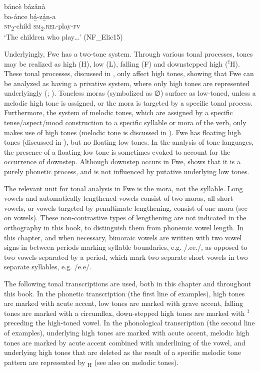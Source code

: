 \ea
\label{bkm:Ref98929728}
báncè bázânà\\
\gll ba-ánce  bá̲-zá̲n-a\\
\textsc{np}\textsubscript{2}-child  \textsc{sm}\textsubscript{2}.\textsc{rel}-play-\textsc{fv}\\
\glt ‘The children who play…’ (NF\_Elic15)
\z

Underlyingly, Fwe has a two-tone system. Through various tonal processes, tones may be realized as high (H), low (L), falling (F) and downstepped high (ꜝH). These tonal pro\-cesses, discussed in , only affect high tones, showing that Fwe can be analyzed as hav\-ing a privative system, where only high tones are represented underlyingly (\citealt{Hyman2001}; \citealt{OddenMarlo2019}). Toneless moras (symbolized as ∅) surface as low-toned, unless a melodic high tone is assigned, or the mora is targeted by a specific tonal process. Furthermore, the system of melodic tones, which are assigned by a specific tense/aspect/mood construction to a specific syllable or mora of the verb, only makes use of high tones (melodic tone is discussed in ). Fwe has floating high tones (discussed in ), but no floating low tones. In the analysis of tone languages, the presence of a floating low tone is sometimes evoked to account for the occurrence of downstep. Although downstep occurs in Fwe,  shows that it is a purely phonetic process, and is not influenced by putative underlying low tones.

The relevant unit for tonal analysis in Fwe is the mora, not the syllable. Long vowels and automatically lengthened vowels consist of two moras, all short vowels, or vowels targeted by penultimate lengthening, consist of one mora (see  on vowels). These non-contrastive types of lengthening are not indicated in the orthography in this book, to distinguish them from phonemic vowel length. In this chapter, and when necessary, bimoraic vowels are written with two vowel signs in between periods marking syllable boundaries, e.g. /.ee./, as opposed to two vowels separated by a period, which mark two separate short vowels in two separate syllables, e.g. /e.e/.

The following tonal transcriptions are used, both in this chapter and throughout this book. In the phonetic transcription (the first line of examples), high tones are marked with acute accent, low tones are marked with grave accent, falling tones are marked with a circumflex, down-stepped high tones are marked with ꜝ preceding the high-toned vowel. In the phonological transcription (the second line of examples), underlying high tones are marked with acute accent, melodic high tones are marked by acute accent combined with underlining of the vowel, and underlying high tones that are deleted as the result of a specific melodic tone pattern are represented by \textsubscript{H} (see also  on melodic tones).

